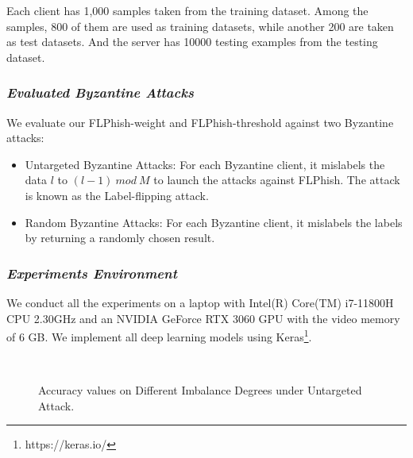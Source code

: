 \documentclass[journal]{IEEEtran}
\begin{document}
  \par Each client has 1,000 samples taken from the training dataset. Among the samples, 800 of them are used as training datasets, while another 200 are taken as test datasets. And the server has 10000 testing examples from the testing dataset. 
  \subsubsection{\textit{Evaluated Byzantine Attacks}} We evaluate our FLPhish-weight and FLPhish-threshold against two Byzantine attacks:
  \begin{itemize}
    \item Untargeted Byzantine Attacks: For each Byzantine client, it mislabels the data $l$ to $(l-1)\ mod\ M$ to launch the attacks against FLPhish. The attack is known as the Label-flipping attack. 
    \item Random Byzantine Attacks: For each Byzantine client, it mislabels the labels by returning a randomly chosen result.
    \end{itemize}

  
  \subsubsection{{\textit{Experiments Environment}}} We conduct all the experiments on a laptop with Intel(R) Core(TM) i7-11800H CPU 2.30GHz and an NVIDIA GeForce RTX 3060 GPU with the video memory of 6 GB. We implement all deep learning models using Keras\footnote{https://keras.io/}.



  \begin{figure}[!htp]
    \centering
    \\
    \caption{Accuracy values on Different Imbalance Degrees under Untargeted Attack.}
    \label{fig_table_imbalances_untargeted}
  \end{figure}
\end{document}
